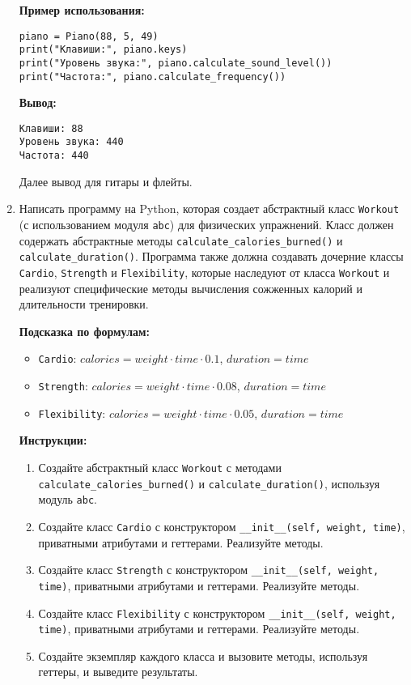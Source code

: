 \begin{enumerate}
\textbf{Пример использования:}
\begin{verbatim}
piano = Piano(88, 5, 49)
print("Клавиши:", piano.keys)
print("Уровень звука:", piano.calculate_sound_level())
print("Частота:", piano.calculate_frequency())
\end{verbatim}

\textbf{Вывод:}
\begin{verbatim}
Клавиши: 88
Уровень звука: 440
Частота: 440
\end{verbatim}

Далее вывод для гитары и флейты.

\item
Написать программу на Python, которая создает абстрактный класс \texttt{Workout} (с использованием модуля \texttt{abc}) для физических упражнений. 
Класс должен содержать абстрактные методы \texttt{calculate\_calories\_burned()} и \texttt{calculate\_duration()}. 
Программа также должна создавать дочерние классы \texttt{Cardio}, \texttt{Strength} и \texttt{Flexibility}, 
которые наследуют от класса \texttt{Workout} и реализуют специфические методы вычисления сожженных калорий и длительности тренировки.

\textbf{Подсказка по формулам:}
\begin{itemize}
    \item \texttt{Cardio}: $calories = weight \cdot time \cdot 0.1$, $duration = time$
    \item \texttt{Strength}: $calories = weight \cdot time \cdot 0.08$, $duration = time$
    \item \texttt{Flexibility}: $calories = weight \cdot time \cdot 0.05$, $duration = time$
\end{itemize}

\textbf{Инструкции:}
\begin{enumerate}
    \item Создайте абстрактный класс \texttt{Workout} с методами \texttt{calculate\_calories\_burned()} и \texttt{calculate\_duration()}, используя модуль \texttt{abc}.
    \item Создайте класс \texttt{Cardio} с конструктором \texttt{\_\_init\_\_(self, weight, time)}, приватными атрибутами и геттерами. Реализуйте методы.
    \item Создайте класс \texttt{Strength} с конструктором \texttt{\_\_init\_\_(self, weight, time)}, приватными атрибутами и геттерами. Реализуйте методы.
    \item Создайте класс \texttt{Flexibility} с конструктором \texttt{\_\_init\_\_(self, weight, time)}, приватными атрибутами и геттерами. Реализуйте методы.
    \item Создайте экземпляр каждого класса и вызовите методы, используя геттеры, и выведите результаты.
\end{enumerate}


\end{enumerate}
